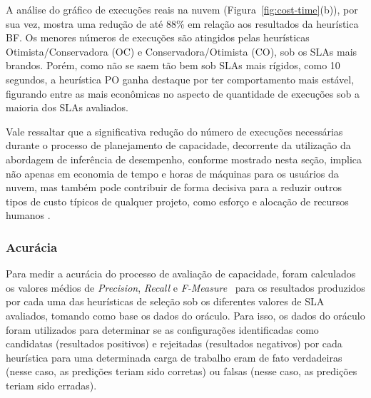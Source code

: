\documentclass[12pt]{article}
\begin{document}
A análise do gráfico de execuções reais na nuvem (Figura~\ref{fig:cost-time}(b)), por sua vez, mostra uma redução de até 88\% em relação aos resultados da heurística BF. Os menores números de execuções são atingidos pelas heurísticas Otimista/Conservadora (OC) e Conservadora/Otimista (CO), sob os SLAs mais brandos. Porém, como não se saem tão 
bem sob SLAs mais rígidos, como 10 segundos, a heurística PO ganha destaque por ter comportamento mais estável, figurando entre as mais econômicas no aspecto de quantidade de execuções sob a maioria dos SLAs avaliados. 

Vale ressaltar que a significativa redução do número de execuções necessárias durante o processo de planejamento de capacidade, decorrente da utilização da abordagem de inferência de desempenho, conforme mostrado nesta seção, implica não apenas em economia de tempo e horas de máquinas para os usuários da nuvem, mas também pode contribuir de forma decisiva para a reduzir outros tipos de custo típicos de qualquer projeto, como esforço e alocação de recursos humanos .





\subsubsection{Acurácia}

\unboldmath

Para medir a acurácia do processo de avaliação de capacidade, foram calculados os valores médios de \emph{Precision}, \emph{Recall} e \emph{F-Measure}~\cite{Baeza-Yates1999} para os resultados produzidos por cada uma das heurísticas de seleção sob os diferentes valores de SLA avaliados, tomando como base os dados do oráculo.  Para isso, os dados do oráculo foram utilizados para determinar se as configurações identificadas como candidatas (resultados positivos) e rejeitadas (resultados negativos) por cada heurística para uma determinada carga de trabalho eram de fato verdadeiras (nesse caso, as predições teriam sido corretas) ou falsas (nesse caso, as predições teriam sido erradas).
\end{document}
